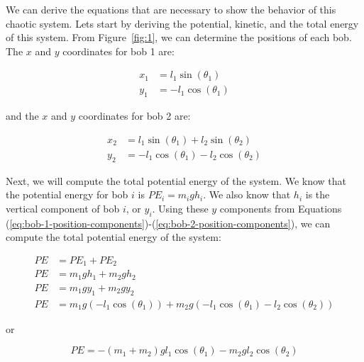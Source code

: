 We can derive the equations that are necessary to show the behavior of this chaotic system. Lets start by deriving the potential, kinetic, and the total energy of this system. From Figure~\ref{fig:1}, we can determine the positions of each bob. The $x$ and $y$ coordinates for bob 1 are:

\begin{equation}
    \begin{aligned}
        x_1 &= l_1\sin\left(\theta_1\right)\\
        y_1 &= -l_1\cos\left(\theta_1\right)
    \end{aligned}
    \label{eq:bob-1-position-components}
\end{equation}

and the $x$ and $y$ coordinates for bob 2 are:

\begin{equation}
    \begin{aligned}
        x_2 &= l_1\sin\left(\theta_1\right) + l_2\sin\left(\theta_2\right)\\
        y_2 &= -l_1\cos\left(\theta_1\right) - l_2\cos\left(\theta_2\right)
    \end{aligned}
    \label{eq:bob-2-position-components}
\end{equation}

Next, we will compute the total potential energy of the system. We know that the potential energy for bob $i$ is $PE_i = m_i g h_i$. We also know that $h_i$ is the vertical component of bob $i$, or $y_i$. Using these $y$ components from Equations (\ref{eq:bob-1-position-components})-(\ref{eq:bob-2-position-components}), we can compute the total potential energy of the system:

\begin{align*}
    PE &= PE_1 + PE_2\\
    PE &= m_1gh_1 + m_2gh_2\\
    PE &= m_1gy_1 + m_2gy_2\\
    PE &= m_1g\left(-l_1\cos\left(\theta_1\right)\right) + m_2g\left(-l_1\cos\left(\theta_1\right) - l_2\cos\left(\theta_2\right)\right)
\end{align*}

or 

\begin{equation}
    PE = -\left(m_1 + m_2\right)gl_1\cos\left(\theta_1\right) - m_2gl_2\cos\left(\theta_2\right)
    \label{eq:potential-energy}
\end{equation}

